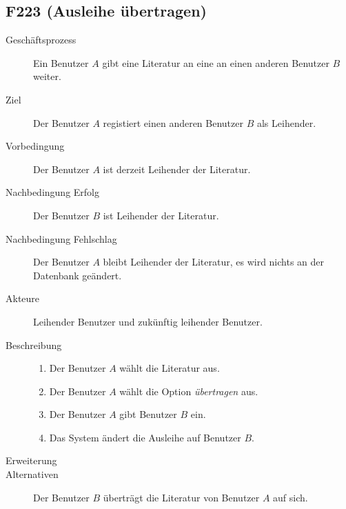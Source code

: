 \subsection{F223 (Ausleihe übertragen)}
\begin{description}
  \item[Geschäftsprozess]Ein Benutzer $A$ gibt eine Literatur an eine an einen anderen Benutzer $B$ weiter.
  \item[Ziel]Der Benutzer $A$ registiert einen anderen Benutzer $B$ als Leihender.
  \item[Vorbedingung]Der Benutzer $A$ ist derzeit Leihender der Literatur.
  \item[Nachbedingung Erfolg]Der Benutzer $B$ ist Leihender der Literatur.
  \item[Nachbedingung Fehlschlag]Der Benutzer $A$ bleibt Leihender der Literatur, es wird nichts an der Datenbank geändert.
  \item[Akteure]Leihender Benutzer und zukünftig leihender Benutzer.
  \item[Beschreibung]
    \begin{enumerate}
      \item Der Benutzer $A$ wählt die Literatur aus.
      \item Der Benutzer $A$ wählt die Option \emph{übertragen} aus.
      \item Der Benutzer $A$ gibt Benutzer $B$ ein.
      \item Das System ändert die Ausleihe auf Benutzer $B$.
    \end{enumerate}
  \item[Erweiterung]
  \item[Alternativen]Der Benutzer $B$  überträgt die Literatur von Benutzer $A$ auf sich.
\end{description}

